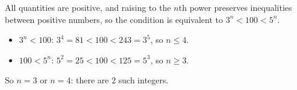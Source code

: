 All quantities are positive, and raising to the $n$th power preserves inequalities between positive numbers, so the condition is equivalent to $3^n<100<5^n$.
\begin{itemize}
\item $3^n<100$: $3^4=81<100<243=3^5$, so $n\le4$.
\item $100<5^n$: $5^2=25<100<125=5^3$, so $n\ge3$.
\end{itemize}
So $n=3$ or $n=4$: there are $\boxed{2}$ such integers.
